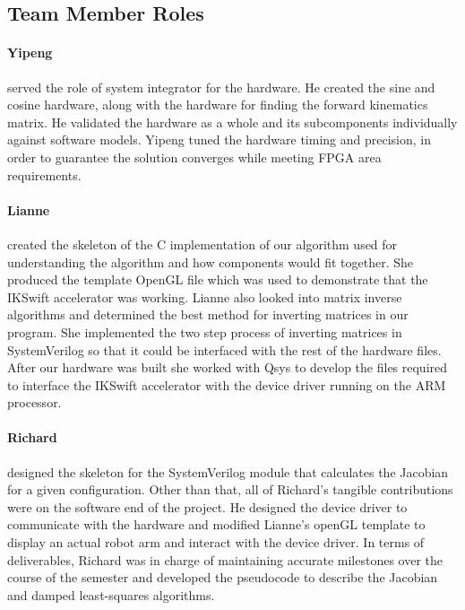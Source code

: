 \subsection{Team Member Roles}

\paragraph{Yipeng} served the role of system integrator for the hardware. He created the sine and cosine hardware, along with the hardware for finding the forward kinematics matrix. He validated the hardware as a whole and its subcomponents individually against software models. Yipeng tuned the hardware timing and precision, in order to guarantee the solution converges while meeting FPGA area requirements.

\paragraph{Lianne} created the skeleton of the C implementation of our algorithm used 
for understanding the algorithm and how components would fit together. She 
produced the template OpenGL file which was used to demonstrate that the 
IKSwift accelerator was working. Lianne also looked into matrix inverse 
algorithms and determined the best method for inverting matrices in our 
program. She implemented the two step process of inverting matrices in 
SystemVerilog so that it could be interfaced with the rest of the 
hardware files. After our hardware was built she worked with Qsys to 
develop the files required to interface the IKSwift accelerator with 
the device driver running on the ARM processor. 

\paragraph{Richard} designed the skeleton for the SystemVerilog module that calculates the Jacobian
for a given configuration. Other than that, all of Richard's tangible contributions were on the
software end of the project. He designed the device driver to communicate with the hardware and
modified Lianne's openGL template to display an actual robot arm and interact with the device
driver. In terms of deliverables, Richard was in charge of maintaining accurate milestones over the
course of the semester and developed the pseudocode to describe the Jacobian and
damped least-squares algorithms.
